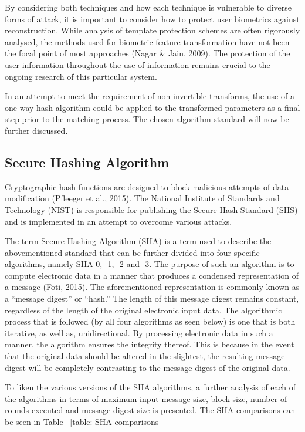     
    By considering both techniques and how each technique is vulnerable to diverse forms of attack, it is important to consider how to protect user biometrics against reconstruction. While analysis of template protection schemes are often rigorously analysed, the methods used for biometric feature transformation have not been the focal point of most approaches (Nagar \& Jain, 2009). The protection of the user information throughout the use of information remains crucial to the ongoing research of this particular system. 
    
    In an attempt to meet the requirement of non-invertible transforms, the use of a one-way hash algorithm could be applied to the transformed parameters as a final step prior to the matching process. The chosen algorithm standard will now be further discussed.

    \subsection{ Secure Hashing Algorithm}
    
    Cryptographic hash functions are designed to block malicious attempts of data modification (Pfleeger et al., 2015). The National Institute of Standards and Technology (NIST) is responsible for publishing the Secure Hash Standard (SHS) and is implemented in an attempt to overcome various attacks. 
    
    The term Secure Hashing Algorithm (SHA) is a term used to describe the abovementioned standard that can be further divided into four specific algorithms, namely SHA-0, -1, -2 and -3. The purpose of such an algorithm is to compute electronic data in a manner that produces a condensed representation of a message (Foti, 2015). The aforementioned representation is commonly known as a “message digest” or “hash.” The length of this message digest remains constant, regardless of the length of the original electronic input data. The algorithmic process that is followed (by all four algorithms as seen below) is one that is both iterative, as well as, unidirectional. By processing electronic data in such a manner, the algorithm ensures the integrity thereof. This is because in the event that the original data should be altered in the slightest, the resulting message digest will be completely contrasting to the message digest of the original data. 
    
    To liken the various versions of the SHA algorithms, a further analysis of each of the algorithms in terms of maximum input message size, block size, number of rounds executed and message digest size is presented. The SHA comparisons can be seen in Table ~\ref{table: SHA comparisons}
    
